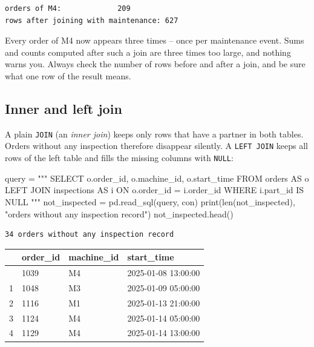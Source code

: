 \documentclass[
  letterpaper,
  DIV=11,
  numbers=noendperiod]{scrreprt}
\newenvironment{Shaded}{\begin{snugshade}}{\end{snugshade}}
\newcommand{\BuiltInTok}[1]{\textcolor[rgb]{0.00,0.23,0.31}{#1}}
\newcommand{\NormalTok}[1]{\textcolor[rgb]{0.00,0.23,0.31}{#1}}
\newcommand{\OperatorTok}[1]{\textcolor[rgb]{0.37,0.37,0.37}{#1}}
\newcommand{\StringTok}[1]{\textcolor[rgb]{0.13,0.47,0.30}{#1}}
\begin{document}
\begin{verbatim}
orders of M4:             209
rows after joining with maintenance: 627
\end{verbatim}

Every order of M4 now appears three times -- once per maintenance event.
Sums and counts computed after such a join are three times too large,
and nothing warns you. Always check the number of rows before and after
a join, and be sure what one row of the result means.

\subsection{Inner and left join}\label{inner-and-left-join}

A plain \texttt{JOIN} (an \emph{inner join}) keeps only rows that have a
partner in both tables. Orders without any inspection therefore
disappear silently. A \texttt{LEFT\ JOIN} keeps all rows of the left
table and fills the missing columns with \texttt{NULL}:

\begin{Shaded}
\begin{Highlighting}[]
\NormalTok{query }\OperatorTok{=} \StringTok{"""}
\StringTok{SELECT o.order\_id, o.machine\_id, o.start\_time}
\StringTok{FROM orders AS o}
\StringTok{LEFT JOIN inspections AS i ON o.order\_id = i.order\_id}
\StringTok{WHERE i.part\_id IS NULL}
\StringTok{"""}
\NormalTok{not\_inspected }\OperatorTok{=}\NormalTok{ pd.read\_sql(query, con)}
\BuiltInTok{print}\NormalTok{(}\BuiltInTok{len}\NormalTok{(not\_inspected), }\StringTok{"orders without any inspection record"}\NormalTok{)}
\NormalTok{not\_inspected.head()}
\end{Highlighting}
\end{Shaded}

\begin{verbatim}
34 orders without any inspection record
\end{verbatim}

\begin{longtable}[]{@{}llll@{}}
\toprule\noalign{}
& order\_id & machine\_id & start\_time \\
\midrule\noalign{}
\endhead
\bottomrule\noalign{}
\endlastfoot
0 & 1039 & M4 & 2025-01-08 13:00:00 \\
1 & 1048 & M3 & 2025-01-09 05:00:00 \\
2 & 1116 & M1 & 2025-01-13 21:00:00 \\
3 & 1124 & M4 & 2025-01-14 05:00:00 \\
4 & 1129 & M4 & 2025-01-14 13:00:00 \\
\end{longtable}
\end{document}
